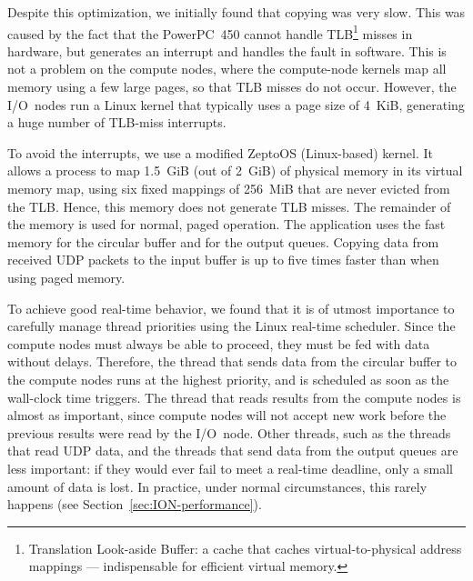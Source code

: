 \documentclass{sig-alternate}
\begin{document}
Despite this optimization, we initially found that copying was very slow.
This was caused by the fact that the PowerPC~450 cannot handle
TLB\footnote{Translation Look-aside Buffer: a cache that caches
virtual-to-physical address mappings --- indispensable for efficient virtual
memory.} misses in hardware, but generates an interrupt and handles the fault
in software.
This is not a problem on the compute nodes, where the compute-node kernels 
map all memory using a few large pages, so that TLB misses do not occur.
However, the I/O~nodes run a Linux kernel that typically uses a page size of
4~KiB, generating a huge number of TLB-miss interrupts.

To avoid the interrupts, we use a modified ZeptoOS (Linux-based)
kernel\cite{Yoshii:09}.
It allows a process to map 1.5~GiB (out of 2~GiB) of physical memory in its
virtual memory map, using six fixed mappings of 256~MiB that are never evicted
from the TLB.
Hence, this memory does not generate TLB misses.
The remainder of the memory is used for normal, paged operation.
The application uses the fast memory for the circular buffer and for the
output queues.
Copying data from received UDP packets to the input buffer is up to five times
faster than when using paged memory.

To achieve good real-time behavior, we found that it is of utmost importance
to carefully manage thread priorities using the Linux real-time scheduler.
Since the compute nodes must always be able to proceed, they must be fed with
data without delays.
Therefore, the thread that sends data from the circular buffer to the
compute nodes runs at the highest priority, and is scheduled as soon as the
wall-clock time triggers.
The thread that reads results from the compute nodes is almost as
important, since compute nodes will not accept new work before the previous
results were read by the I/O~node.
Other threads, such as the threads that read UDP data, and the threads that
send data from the output queues are less important: if they would ever
fail to meet a real-time deadline, only a small amount of data is lost.
In practice, under normal circumstances, this rarely happens
(see Section~\ref{sec:ION-performance}).

\end{document}
